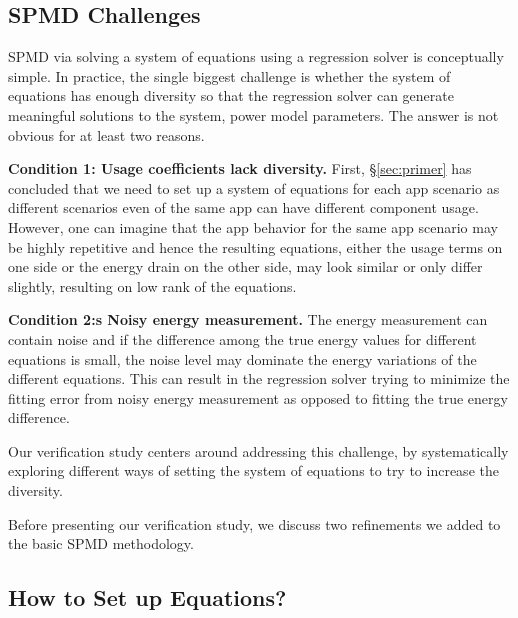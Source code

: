 \subsection{SPMD Challenges}
\label{subsec:challenges}

SPMD via solving a system of equations using a regression solver is conceptually simple. 
In practice, the single biggest challenge is whether the system of equations 
has enough diversity so that the regression solver
can generate meaningful solutions to the system, \ie power model parameters. 
The answer is not obvious for at least two reasons.

{\bf Condition 1: Usage coefficients lack diversity.}
First, \S\ref{sec:primer} has concluded that
we need to set up a system of equations for each app scenario as different scenarios
even of the same app can have different component usage. However, 
one can imagine that the app behavior for the same app scenario may be highly repetitive and hence
the resulting equations, either the usage terms on one side or the energy drain on the other side,
 may look similar or only differ slightly, resulting on low rank of the equations. 

{\bf Condition 2:s Noisy energy measurement.}
The energy measurement can contain noise and if the difference among the true energy values for different equations is small, the noise level may dominate the energy variations of the different equations. This can result in the regression solver trying to minimize the fitting error from noisy energy measurement as opposed to fitting the true energy difference.  

Our verification study centers around addressing this challenge, by systematically exploring different ways of setting the system of equations to try to increase the diversity.

Before presenting our verification study, we discuss two refinements we added
to the basic SPMD methodology.


\fi

\subsection{How to Set up Equations?}
\label{subsec:howtosetup}

